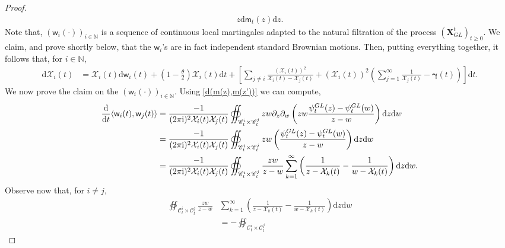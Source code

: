 \documentclass[]{article}
\begin{document}
\begin{proof}
\begin{align}
    z\mathrm{d}\mathsf{m}_t(z)\mathrm{d}z.
\end{align}
Note that,
$\left(\mathsf{w}_i(\cdot)\right)_{i\in\mathbb{N}}$
is a sequence of continuous local martingales adapted to the natural filtration of the process $(\mathbf{X}_{GL}^t)_{t\ge 0}$.
We claim, and prove shortly below, that the
$\mathsf{w}_i$'s are in fact independent 
standard Brownian motions. Then, putting everything together, it follows that, for $ i\in\mathbb{N}$,
\begin{align}\label{mathcalX-ISDE}
 \mathrm{d}\mathcal{X}_i(t)
 &=
 \mathcal{X}_i(t)\mathrm{d}\mathsf{w}_i(t)
 +
 \left(1-\frac{\theta}{2}\right)\mathcal{X}_i(t)
 \mathrm{d}t
   +
   \left[
    \sum_{j\neq i}\frac{\left(\mathcal{X}_i(t)\right)^2}{\mathcal{X}_i(t)-\mathcal{X}_j(t)}
    +\left(\mathcal{X}_i(t)\right)^2\left(\sum_{j=1}^\infty\frac{1}{\mathcal{X}_j(t)}
    -
    \boldsymbol{\gamma}(t)\right)\right]\mathrm{d}t.
\end{align}
We now prove the claim on the $\left(\mathsf{w}_i(\cdot)\right)_{i\in\mathbb{N}}$.
Using \eqref{d(m(z),m(z'))} we can compute,
\begin{align*}
    \frac{\mathrm{d}}{\mathrm{d}t}
    \langle
    \mathsf{w}_i(t),
    \mathsf{w}_j(t)
   \rangle
    &=
    \frac{-1}{(2\pi\textnormal{i})^2\mathcal{X}_i(t)
    \mathcal{X}_j(t)}\oiint_{\mathscr{C}_t^i
    \times 
    \mathscr{C}_t^j}
    zw\partial_z\partial_w \left(zw\frac{\psi^{GL}_t(z)-\psi^{GL}_t(w)}{z-w}\right)\mathrm{d}z\mathrm{d}w
    \\
     &=
    \frac{-1}{(2\pi\textnormal{i})^2\mathcal{X}_i(t)
    \mathcal{X}_j(t)}\oiint_{\mathscr{C}_t^i
    \times 
    \mathscr{C}_t^j}
    zw\left(\frac{\psi^{GL}_t(z)-\psi^{GL}_t(w)}{z-w}\right)\mathrm{d}z\mathrm{d}w
    \\
     &=
    \frac{-1}{(2\pi\textnormal{i})^2\mathcal{X}_i(t)
    \mathcal{X}_j(t)}\oiint_{\mathscr{C}_t^i
    \times 
    \mathscr{C}_t^j}
    \frac{zw}{z-w}
    \sum_{k=1}^\infty
    \left(
    \frac{1}{z-\mathcal{X}_k(t)}
    -
    \frac{1}{w-\mathcal{X}_k(t)}
    \right)
    \mathrm{d}z\mathrm{d}w.
\end{align*}
Observe now that, for $i\neq j$,
\begin{align*}
\oiint_{\mathscr{C}_t^i
    \times 
    \mathscr{C}_t^j}
    \frac{zw}{z-w}
    &\sum_{k=1}^\infty
    \left(
    \frac{1}{z-\mathcal{X}_k(t)}
    -
    \frac{1}{w-\mathcal{X}_k(t)}
    \right)
    \mathrm{d}z\mathrm{d}w
     \\&=
     -
\oiint_{\mathscr{C}_t^i
    \times 
    \mathscr{C}_t^j}

\end{align*}
\end{proof}
\end{document}
